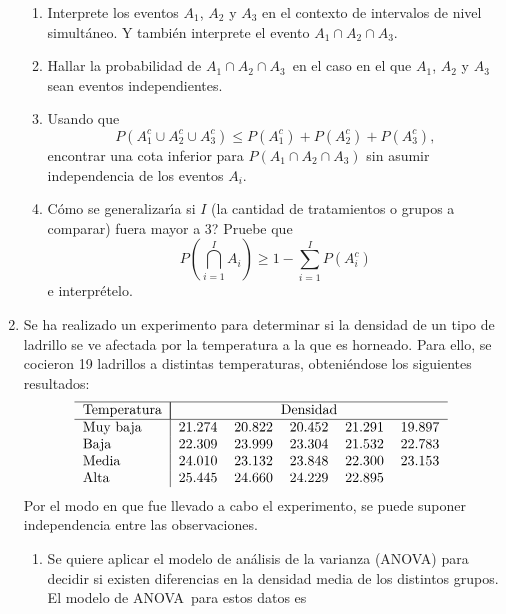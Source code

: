 \documentclass[11pt,a4paper,twoside]{article}%
\begin{document}
\begin{enumerate}
\begin{enumerate}
\item Interprete los eventos $A_{1}$, $A_{2}$ y $A_{3}$ en el contexto de
intervalos de nivel simult\'{a}neo. Y tambi\'{e}n interprete el evento
$A_{1}\cap A_{2}\cap A_{3}.$

\item Hallar la probabilidad de $A_{1}\cap A_{2}\cap A_{3}$\ en el caso en el
que $A_{1}$, $A_{2}$ y $A_{3}$ sean eventos independientes.

\item Usando que
\[
P\left(  A_{1}^{c}\cup A_{2}^{c}\cup A_{3}^{c}\right)  \leq P\left(  A_{1}%
^{c}\right)  +P\left(  A_{2}^{c}\right)  +P\left(  A_{3}^{c}\right)  ,
\]
encontrar una cota inferior para $P\left(  A_{1}\cap A_{2}\cap A_{3}\right)  $
sin asumir independencia de los eventos $A_{i}$.

\item \textquestiondown C\'{o}mo se generalizar\'{\i}a si $I$ (la cantidad de
tratamientos o grupos a comparar) fuera mayor a 3? Pruebe que
\[
P\left(  \bigcap_{i=1}^{I}A_{i}\right)  \geq1-\sum_{i=1}^{I}P\left(  A_{i}%
^{c}\right)
\]
e interpr\'{e}telo.
\end{enumerate}

\item Se ha realizado un experimento para determinar si la densidad de un tipo
de ladrillo se ve afectada por la temperatura a la que es horneado. Para ello,
se cocieron 19 ladrillos a distintas temperaturas, obteni\'{e}ndose los
siguientes resultados:%
\[
\text{%
\begin{tabular}
[c]{l|ccccc}\hline
Temperatura & \multicolumn{5}{|c}{Densidad}\\\hline
Muy baja & 21.274 & 20.822 & 20.452 & 21.291 & 19.897\\
Baja & 22.309 & 23.999 & 23.304 & 21.532 & 22.783\\
Media & 24.010 & 23.132 & 23.848 & 22.300 & 23.153\\
Alta & 25.445 & 24.660 & 24.229 & 22.895 &
\end{tabular}
}%
\]
Por el modo en que fue llevado a cabo el experimento, se puede suponer
independencia entre las observaciones.

\begin{enumerate}
\item Se quiere aplicar el modelo de an\'{a}lisis de la varianza (ANOVA) para
decidir si existen diferencias en la densidad media de los distintos grupos.
El modelo de ANOVA\ para estos datos es


\end{enumerate}
\end{enumerate}
\end{document}
